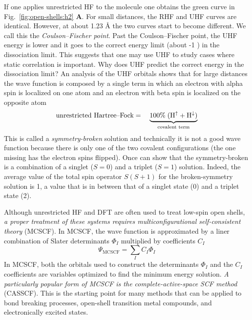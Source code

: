 \documentclass[../Main/chem371-notes.tex]{subfiles}
\begin{document}
If one applies unrestricted HF to the  molecule one obtains the green curve in Fig.~\ref{fig:open-shells:h2} \textbf{A}.
For small  distances, the RHF and UHF curves are identical.
However, at about 1.23 \AA{} the two curves start to become different.
We call this the \emph{Coulson--Fischer point}.
Past the Coulson--Fischer point, the UHF energy is lower and it goes to the correct energy limit (about -1 \Eh) in the dissociation limit.
This suggests that one may use UHF to study cases where static correlation is important.
Why does UHF predict the correct energy in the dissociation limit?
An analysis of the UHF orbitals shows that for large  distances the wave function is composed by a single term in which an electron with alpha spin is localized on one atom and an electron with beta spin is localized on the opposite atom 
\begin{equation}
\text{unrestricted Hartree--Fock} = \quad \underbrace{100\% \; (\ce{H}^{\uparrow} + \ce{H}^{\downarrow}) }_{\text{covalent term}}
\end{equation}
This is called a \emph{symmetry-broken} solution and technically it is not a good wave function because there is only one of the two covalent configurations (the one missing has the electron spins flipped).
Once can show that the symmetry-broken is a combination of a singlet ($S = 0$) and a triplet ($S = 1$) solution.
Indeed, the average value of the total spin operator $S(S+1)$ for the broken-symmetry solution is 1, a value that is in between that of a singlet state (0) and a triplet state (2).

Although unrestricted HF and DFT are often used to treat low-spin open shells, \emph{a proper treatment of these systems requires  multiconfigurational self-consistent theory} (MCSCF).
In MCSCF, the wave function is approximated by a liner combination of Slater determinants $\Phi_{I}$ multiplied by coefficients $C_I$
\begin{equation}
\Psi_{\text{MCSCF}} = \sum_I C_I \Phi_{I}
\end{equation}
In MCSCF, both the orbitals used to construct the determinants $\Phi_{I}$ and the $C_I$ coefficients are variables optimized to find the minimum   energy solution.
\emph{A particularly popular form of MCSCF is the complete-active-space SCF method} (CASSCF). This is the starting point for many methods that can be applied to bond breaking processes, open-shell transition metal compounds, and electronically excited states.
\end{document}
